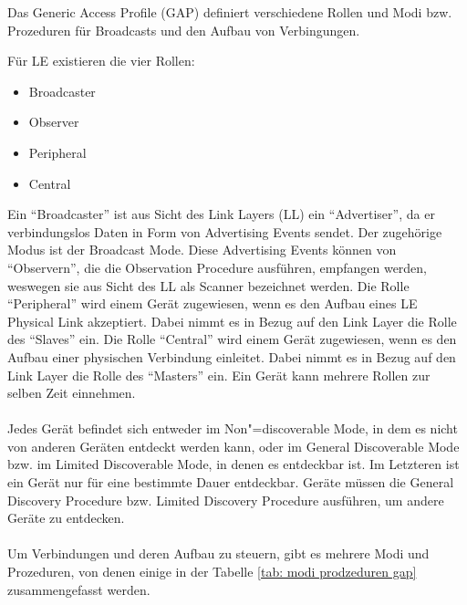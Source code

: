 Das Generic Access Profile (GAP) definiert verschiedene Rollen und Modi bzw. Prozeduren für Broadcasts und den Aufbau von Verbingungen.

Für LE existieren die vier Rollen:
\begin{itemize}
    \item Broadcaster
    \item Observer
    \item Peripheral
    \item Central
\end{itemize}
Ein "`Broadcaster"' ist aus Sicht des Link Layers (LL) ein "`Advertiser"', da er verbindungslos Daten in Form von Advertising Events sendet. Der zugehörige Modus ist der Broadcast Mode. Diese Advertising Events können von "`Observern"', die die Observation Procedure ausführen, empfangen werden, weswegen sie aus Sicht des LL als Scanner bezeichnet werden. Die Rolle "`Peripheral"' wird einem Gerät zugewiesen, wenn es den Aufbau eines LE Physical Link akzeptiert. Dabei nimmt es in Bezug auf den Link Layer die Rolle des "`Slaves"' ein. Die Rolle "`Central"' wird einem Gerät zugewiesen, wenn es den Aufbau einer physischen Verbindung einleitet. Dabei nimmt es in Bezug auf den Link Layer die Rolle des "`Masters"' ein. Ein Gerät kann mehrere Rollen zur selben Zeit einnehmen. \cite{BtSpec4.0_1638-1639} \cite{BtSpec4.0_1695-1697}
\\\\
Jedes Gerät befindet sich entweder im Non"=discoverable Mode, in dem es nicht von anderen Geräten entdeckt werden kann, oder im General Discoverable Mode bzw. im Limited Discoverable Mode, in denen es entdeckbar ist. Im Letzteren ist ein Gerät nur für eine bestimmte Dauer entdeckbar. Geräte müssen die General Discovery Procedure bzw. Limited Discovery Procedure ausführen, um andere Geräte zu entdecken. \cite{BtSpec4.0_1697}
\\\\
Um Verbindungen und deren Aufbau zu steuern, gibt es mehrere Modi und Prozeduren, von denen einige in der Tabelle \ref{tab: modi prodzeduren gap} zusammengefasst werden.

